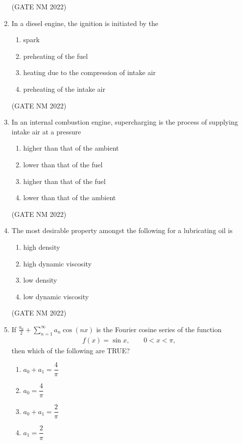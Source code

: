 \documentclass[journal,12pt,onecolumn]{IEEEtran}
\theoremstyle{remark}
\begin{document}
\begin{enumerate}
\hfill(GATE NM 2022)

\item  In a diesel engine, the ignition is initiated by the
	\begin{multicols}{2}
\begin{enumerate}
    \item spark
    \item preheating of the fuel
    \item heating due to the compression of intake air
    \item preheating of the intake air
\end{enumerate}
	\end{multicols}

\hfill(GATE NM 2022)

\item  In an internal combustion engine, supercharging is the process of supplying intake air at a pressure
\begin{enumerate}
    \item higher than that of the ambient
    \item lower than that of the fuel
    \item higher than that of the fuel
    \item lower than that of the ambient
\end{enumerate}

\hfill(GATE NM 2022)

\item  The most desirable property amongst the following for a lubricating oil is
	\begin{multicols}{2}
\begin{enumerate}
    \item high density
    \item high dynamic viscosity
    \item low density
    \item low dynamic viscosity
\end{enumerate}
	\end{multicols}

\hfill(GATE NM 2022)

\item  If
$\frac{a_0}{2} + \sum_{n=1}^{\infty} a_n \cos(nx)$
is the Fourier cosine series of the function
\begin{align*}
f(x)=\sin x,\qquad 0<x<\pi,
\end{align*}
then which of the following are TRUE?
\begin{multicols}{4}
\begin{enumerate}
	\item  $a_0 + a_1 = \dfrac{4}{\pi}$
	\item   $a_0 = \dfrac{4}{\pi}$
	\item   $a_0 + a_1 = \dfrac{2}{\pi}$
	\item   $a_1 = \dfrac{2}{\pi}$
\end{enumerate}
\end{multicols}


\end{enumerate}
\end{document}
